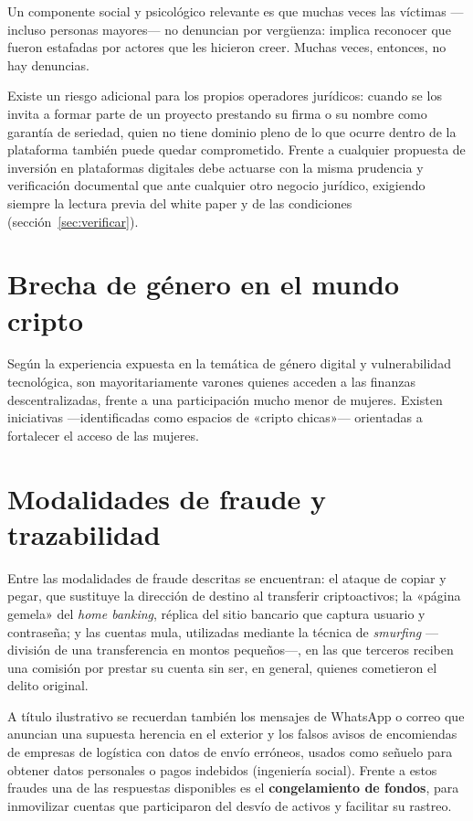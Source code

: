 \documentclass[12pt,oneside]{book}
\begin{document}
Un componente social y psicológico relevante es que muchas veces las víctimas ---incluso personas mayores--- no denuncian por vergüenza: implica reconocer que fueron estafadas por actores que les hicieron creer. Muchas veces, entonces, no hay denuncias.

\begin{warning}
Existe un riesgo adicional para los propios operadores jurídicos: cuando se los invita a formar parte de un proyecto prestando su firma o su nombre como garantía de seriedad, quien no tiene dominio pleno de lo que ocurre dentro de la plataforma también puede quedar comprometido. Frente a cualquier propuesta de inversión en plataformas digitales debe actuarse con la misma prudencia y verificación documental que ante cualquier otro negocio jurídico, exigiendo siempre la lectura previa del white paper y de las condiciones (sección~\ref{sec:verificar}).
\end{warning}

\section{Brecha de género en el mundo cripto}

Según la experiencia expuesta en la temática de género digital y vulnerabilidad tecnológica, son mayoritariamente varones quienes acceden a las finanzas descentralizadas, frente a una participación mucho menor de mujeres. Existen iniciativas ---identificadas como espacios de «cripto chicas»--- orientadas a fortalecer el acceso de las mujeres.

\section{Modalidades de fraude y trazabilidad}

\begin{important}
Entre las modalidades de fraude descritas se encuentran: el ataque de copiar y pegar, que sustituye la dirección de destino al transferir criptoactivos; la «página gemela» del \emph{home banking}, réplica del sitio bancario que captura usuario y contraseña; y las cuentas mula, utilizadas mediante la técnica de \emph{smurfing} ---división de una transferencia en montos pequeños---, en las que terceros reciben una comisión por prestar su cuenta sin ser, en general, quienes cometieron el delito original.
\end{important}

A título ilustrativo se recuerdan también los mensajes de WhatsApp o correo que anuncian una supuesta herencia en el exterior y los falsos avisos de encomiendas de empresas de logística con datos de envío erróneos, usados como señuelo para obtener datos personales o pagos indebidos (ingeniería social). Frente a estos fraudes una de las respuestas disponibles es el \textbf{congelamiento de fondos}, para inmovilizar cuentas que participaron del desvío de activos y facilitar su rastreo.
\end{document}
